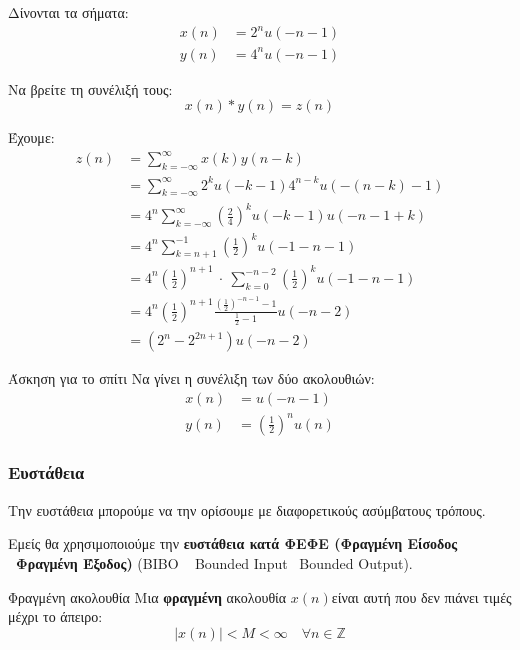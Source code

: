 \documentclass[11pt,a4paper,notitlepage,fleqn]{article}
\begin{document}
\begin{exercise}
	Δίνονται τα σήματα:
	\begin{align*}
	x(n) &= 2^n u(-n-1)\\
	y(n) &= 4^n u(-n-1)
	\end{align*}
	
	Να βρείτε τη συνέλιξή τους:
	\[
	x(n) * y(n) = z(n)
	\]
	
	\tcblower
	Έχουμε:
	\begin{align*}
		z(n) &= \sum_{k=-\infty}^{\infty} x(k)y(n-k)
		\\ &= \sum_{k=-\infty}^{\infty}
		2^k u(-k-1) 4^{n-k} u \left(-(n-k)-1\right)
		\\ &= 4^n\sum_{k=-\infty}^{\infty}\left(\frac{2}{4}\right)^k u(-k-1)u(-n-1+k)
		\\ &= 4^n\sum_{k=n+1}^{-1} \left(\frac{1}{2}\right)^k u(-1-n-1)
		\\ &= 4^n\left(\frac{1}{2}\right)^{n+1}\ \cdot \ \sum_{k=0}^{-n-2}\left(\frac{1}{2}\right)^k
		u(-1-n-1)
		\\ &= 4^n \left(\frac{1}{2}\right)^{n+1}
		\frac{\left(\frac{1}{2}\right)^{-n-1}-1}{\frac{1}{2}-1}u(-n-2)
		\\ &= \left(2^n-2^{2n+1}\right)u(-n-2)
	\end{align*}
\end{exercise}

\begin{questionbox}{Άσκηση για το σπίτι}
	Να γίνει η συνέλιξη των δύο ακολουθιών:
	\begin{align*}
		x(n) &= u(-n-1)\\
		y(n) &= \left(\frac{1}{2}\right)^n u(n)
	\end{align*}
\end{questionbox}


\subsubsection{Ευστάθεια}
Την ευστάθεια μπορούμε να την ορίσουμε με διαφορετικούς ασύμβατους τρόπους.

Εμείς θα χρησιμοποιούμε την \textbf{ευστάθεια κατά ΦΕΦΕ (Φραγμένη Είσοδος \textendash~Φραγμένη Έξοδος)} (BIBO \textemdash~ Bounded Input \textendash~Bounded Output).

\begin{defn}{Φραγμένη ακολουθία}{}
	Μια \textbf{φραγμένη} ακολουθία \( x(n) \)είναι αυτή που δεν πιάνει τιμές μέχρι το άπειρο:
	\[
	\left|x(n)\right| < M < \infty \quad \forall n \in \mathbb Z
	\]
\end{defn}
\end{document}
